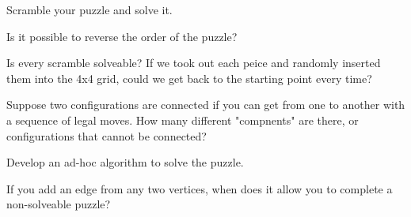 \documentclass[12pt]{article}
\author{Warren Atkison}
\date{\today}
\newenvironment{problem}[2][Problem]{\begin{trivlist}
\item[\hskip \labelsep {\bfseries #1} \hskip \labelsep {\bfseries #2.}]}{\end{trivlist}}
\begin{document}
\fancyhf{}
\fancyhead[R]{\today}
\fancyfoot[R]{\thepage}

\begin{problem}{1}
	Scramble your puzzle and solve it.
\end{problem}
\vspace{50pt}
\begin{problem}{2}
	Is it possible to reverse the order of the puzzle?
\end{problem}
\vspace{50pt}
\begin{problem}{3}
	Is every scramble solveable? If we took out each peice and randomly inserted them into the 4x4 grid, could we get back to the starting point every time?
\end{problem}
\vspace{50pt}
\begin{problem}{4}
	Suppose two configurations are connected if you can get from one to another with a sequence of legal moves. How many different "compnents" are there, or configurations that cannot be connected?
\end{problem}
\vspace{50pt}
\begin{problem}{5}
	Develop an ad-hoc algorithm to solve the puzzle.
\end{problem}
\vspace{50pt}
\begin{problem}{6}
	If you add an edge from any two vertices, when does it allow you to complete a non-solveable puzzle?
\end{problem}
\vspace{50pt}
\end{document}
